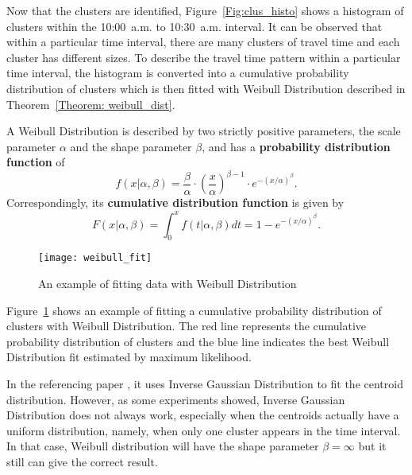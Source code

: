 Now that the clusters are identified, Figure~\ref{Fig:clus_histo} shows a histogram of clusters within the 10:00~a.m. to 10:30~a.m. interval. It can be observed that within a particular time interval, there are many clusters of travel time and each cluster has different sizes. To describe the travel time pattern within a particular time interval, the histogram is converted into a cumulative probability distribution of clusters which is then fitted with Weibull Distribution described in Theorem~\ref{Theorem: weibull_dist}. 

\begin{theorem}\label{Theorem: weibull_dist}
A Weibull Distribution is described by two strictly positive parameters, the scale parameter $\alpha$ and the shape parameter $\beta$, and has a \textbf{probability distribution function} of \cite{WEDI}
\begin{equation}
f(x | \alpha, \beta) = \frac{\beta}{\alpha}\cdot(\frac{x}{\alpha})^{\beta - 1}\cdot e^{-(x / \alpha)^{\beta}}.
\end{equation}
Correspondingly, its \textbf{cumulative distribution function} is given by \cite{WEIB}
\begin{equation}
F(x | \alpha, \beta) = \int_{0}^{x} f(t | \alpha, \beta) dt = 1 - e^{-(x / \alpha)^{\beta}}.
\end{equation}
\end{theorem}

\begin{figure}[h!]
\texttt{[image: weibull\_fit]}
\centering
\caption{An example of fitting data with Weibull Distribution}\label{Fig:weibull_fit}
\end{figure}

Figure~\ref{Fig:weibull_fit} shows an example of fitting a cumulative probability distribution of clusters with Weibull Distribution. The red line represents the cumulative probability distribution of clusters and the blue line indicates the best Weibull Distribution fit estimated by maximum likelihood. 

In the referencing paper \cite{TDR10}, it uses Inverse Gaussian Distribution to fit the centroid distribution. However, as some experiments showed, Inverse Gaussian Distribution does not always work, especially when the centroids actually have a uniform distribution, namely, when only one cluster appears in the time interval. In that case, Weibull distribution will have the shape parameter $\beta = \infty$ but it still can give the correct result. 

